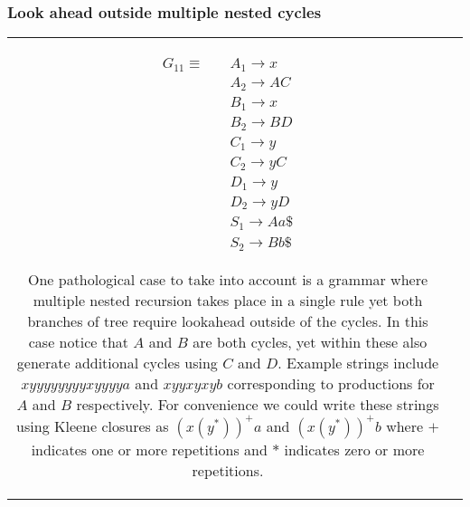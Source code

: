 \documentclass[a4paper,11pt]{article}
\begin{document}
\subsubsection{Look ahead outside multiple nested cycles}
\begin{tabular}[t]{cl}
\parbox{.3\textwidth}{
\begin{align*}
G_{11} \equiv \quad & A_1 \rightarrow x\\
                  & A_2 \rightarrow A C \\
                  & B_1 \rightarrow x\\
                  & B_2 \rightarrow B D\\
                  & C_1 \rightarrow y\\
                  & C_2 \rightarrow y C\\
                  & D_1 \rightarrow y\\
                  & D_2 \rightarrow y D\\
                  & S_1 \rightarrow A a \$\\
                  & S_2 \rightarrow B b \$
\end{align*}}
\parbox{.6\textwidth}{One pathological case to take into account is a grammar where multiple nested recursion takes place in a single rule yet both branches of tree require lookahead outside of the cycles. In this case notice that $A$ and $B$ are both 
cycles, yet within these also generate additional cycles using $C$ and $D$. Example strings include $xyyyyyyyyxyyyya$ and $xyyxyxyb$ corresponding to productions for $A$ and $B$ respectively.
For convenience we could write these strings using Kleene closures as $(x(y^*))^+a$ and $(x(y^*))^+b$ where $+$ indicates one or more repetitions and $*$ indicates zero or more repetitions.}
\end{tabular}
\end{document}
